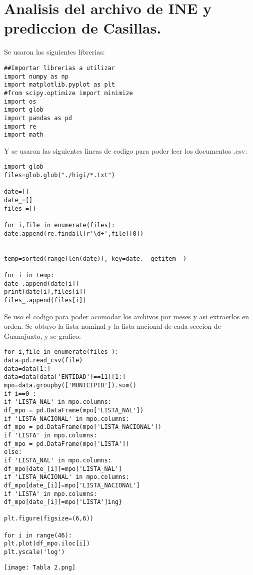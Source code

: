 \documentclass[
	12pt, %
]{fphw}
\begin{document}
\section*{Analisis del archivo de INE y prediccion de Casillas.}

Se usaron las siguientes librerias:

\lstset{language=Python}
\lstset{frame=lines}
\lstset{basicstyle=\footnotesize}
\begin{lstlisting}
##Importar librerias a utilizar 
import numpy as np
import matplotlib.pyplot as plt
#from scipy.optimize import minimize
import os
import glob 
import pandas as pd
import re
import math
\end{lstlisting}

Y se usaron las siguientes lineas de codigo para poder leer los documentos .csv:

\lstset{language=Python}
\lstset{frame=lines}
\lstset{basicstyle=\footnotesize}
\begin{lstlisting}
import glob
files=glob.glob("./higi/*.txt")

date=[]
date_=[]
files_=[]

for i,file in enumerate(files):
date.append(re.findall(r'\d+',file)[0])


temp=sorted(range(len(date)), key=date.__getitem__)

for i in temp:
date_.append(date[i])
print(date[i],files[i])
files_.append(files[i])
\end{lstlisting}

Se uso el codigo para poder acomodar los archivos por meses y asi extraerlos en orden.
Se obtuvo la lista nominal y la lista nacional de cada seccion de Guanajuato, y se grafico.

\lstset{language=Python}
\lstset{frame=lines}
\lstset{basicstyle=\footnotesize}
\begin{lstlisting}
for i,file in enumerate(files_):
data=pd.read_csv(file)
data=data[1:]
data=data[data['ENTIDAD']==11][1:]
mpo=data.groupby(['MUNICIPIO']).sum()
if i==0 :
if 'LISTA_NAL' in mpo.columns:
df_mpo = pd.DataFrame(mpo['LISTA_NAL'])
if 'LISTA_NACIONAL' in mpo.columns:
df_mpo = pd.DataFrame(mpo['LISTA_NACIONAL'])
if 'LISTA' in mpo.columns:
df_mpo = pd.DataFrame(mpo['LISTA'])
else:
if 'LISTA_NAL' in mpo.columns:
df_mpo[date_[i]]=mpo['LISTA_NAL']
if 'LISTA_NACIONAL' in mpo.columns:
df_mpo[date_[i]]=mpo['LISTA_NACIONAL']
if 'LISTA' in mpo.columns:
df_mpo[date_[i]]=mpo['LISTA']ing}

plt.figure(figsize=(6,6))

for i in range(46):
plt.plot(df_mpo.iloc[i])
plt.yscale('log')
\end{lstlisting}

\begin{center}
	\texttt{[image: Tabla 2.png]} %
\end{center}
\end{document}
